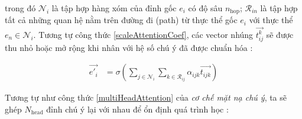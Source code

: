 %
%
%
%
%

trong đó $\mathcal{N}_i$ là tập hợp hàng xóm của đỉnh gốc $e_i$ có độ sâu $n_{\text{hop}}$; $\mathcal{R_{\textit{i} \textit{n}}}$ là tập hợp tất cả những quan hệ nằm trên đường đi (path) từ thực thể gốc $e_i$ với thực thể $e_n \in \mathcal{N}_i$. Tương tự công thức \ref{scaleAttentionCoef}, các vector nhúng $\overrightarrow{t^k_{ij}}$ sẽ được thu nhỏ hoặc mở rộng khi nhân với hệ số chú ý đã được chuẩn hóa :

\begin{align}
	{\overrightarrow{e'_{i}}}&={\sigma\left(\sum_{j \in \mathcal{N}_i} \sum_{k \in \mathcal{R}_{ij}} \alpha_{ijk} \overrightarrow{t_{ijk}}\right)}
\end{align}

Tương tự như công thức \ref{multiHeadAttention} của \textit{cơ chế mặt nạ chú ý}, ta sẽ ghép $N_{\text{head}}$ đỉnh chú ý lại với nhau để ổn định quá trình học :


